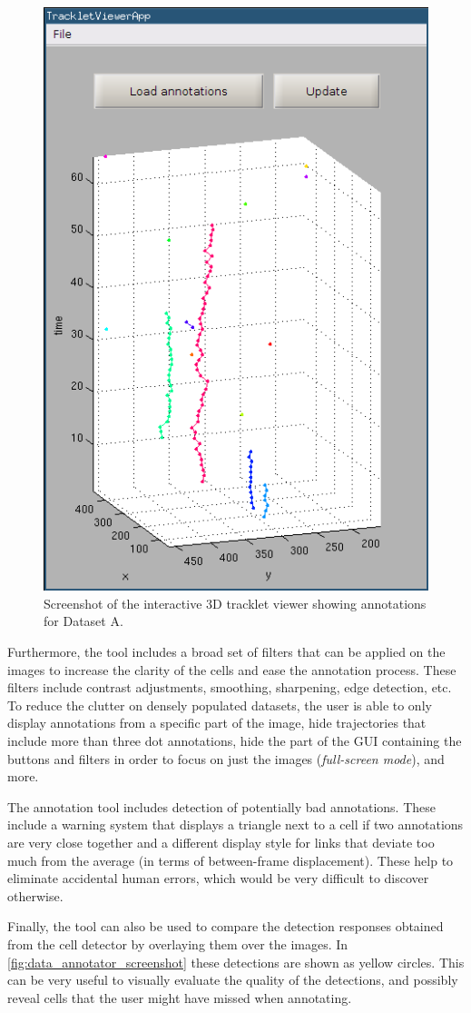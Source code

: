 		\begin{figure}
			\centering
			\includegraphics[width=.48\textwidth]{images/data_tracklet_viewer}
			\caption{Screenshot of the interactive 3D tracklet viewer showing annotations for Dataset A.}
			\label{fig:data_tracklet_viewer}
			
		\end{figure}
				
						
		Furthermore, the tool includes a broad set of filters that can be applied on the images to increase the clarity of the cells and ease the annotation process. These filters include contrast adjustments, smoothing, sharpening, edge detection, etc. To reduce the clutter on densely populated datasets, the user is able to only display annotations from a specific part of the image, hide trajectories that include more than three dot annotations, hide the part of the GUI containing the buttons and filters in order to focus on just the images (\textit{full-screen mode}), and more.
		
		The annotation tool includes detection of potentially bad annotations. These include a warning system that displays a triangle next to a cell if two annotations are very close together and a different display style for links that deviate too much from the average (in terms of between-frame displacement). These help to eliminate accidental human errors, which would be very difficult to discover otherwise.


		Finally, the tool can also be used to compare the detection responses obtained from the cell detector by overlaying them over the images. In \cref{fig:data_annotator_screenshot} these detections are shown as yellow circles. This can be very useful to visually evaluate the quality of the detections, and possibly reveal cells that the user might have missed when annotating.
		

